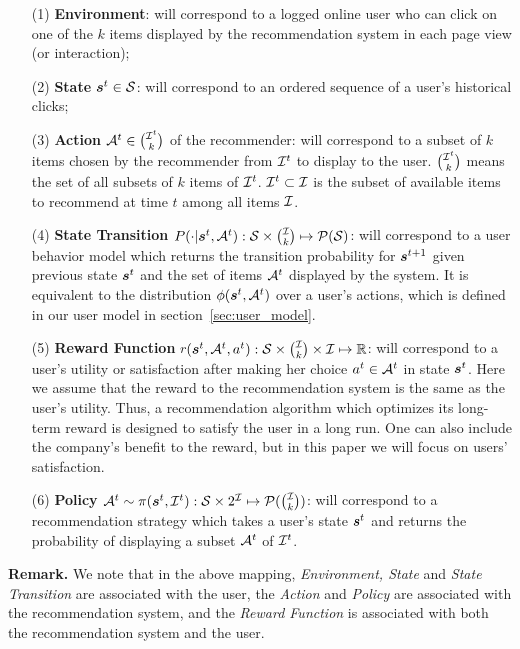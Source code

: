 \documentclass{article} %
\begin{document}
\begin{enumerate}
    \item[(1)] {\bf Environment}: will correspond to a logged online user who can click on one of the $k$ items displayed by the recommendation system in each page view (or interaction);
    \item[(2)] {\bf State ${\bm{s}}^t \in {\mathcal{S}}$}: will correspond to an ordered sequence of a user's historical clicks; %
    \item[(3)] {\bf Action {\small${\mathcal{A}}^t \in {{\mathcal{I}}^t \choose k}$}} of the recommender: will correspond to a subset of $k$ items chosen by the recommender from ${\mathcal{I}}^t$ to display to the user. {\small${{\mathcal{I}}^t \choose k}$} means the set of all subsets of $k$ items of ${\mathcal{I}}^t$. ${\mathcal{I}}^t \subset{{\mathcal{I}}}$ is the subset of available items to recommend at time $t$ among all items ${\mathcal{I}}$. 
    \item[(4)] {\bf State Transition {\small$P(\cdot|{\bm{s}}^t,{\mathcal{A}}^t):{\mathcal{S}} \times {{\mathcal{I}}\choose k} \mapsto {\mathcal{P}}({\mathcal{S}})$}}: will correspond to a user behavior model which returns the transition probability for ${\bm{s}}^{t+1}$ given previous state ${\bm{s}}^t$ and the set of items ${\mathcal{A}}^t$ displayed by the system. It is equivalent to the distribution $\phi({\bm{s}}^t, {\mathcal{A}}^t)$ over a user's actions, which is defined in our user model in section~\ref{sec:user_model}.
    \item[(5)] {\bf Reward Function} $r${\small$({\bm{s}}^t,{\mathcal{A}}^t, a^t):{\mathcal{S}}  \times {{\mathcal{I}}\choose k} \times {\mathcal{I}} \mapsto {\mathbb{R}}$}: will correspond to a user's utility or satisfaction after making her choice {\small$a^t\in {\mathcal{A}}^t$} in state ${\bm{s}}^t$. Here we assume that the reward to the recommendation system is the same as the user's utility. Thus, a recommendation algorithm which optimizes its long-term reward is designed to satisfy the user in a long run. %
    One can also include the company's benefit to the reward, but in this paper we will focus on users'  satisfaction. 
    \item[(6)] {\bf Policy {\small${\mathcal{A}}^t \sim \pi({\bm{s}}^t, {\mathcal{I}}^t):{\mathcal{S}}\times 2^{{\mathcal{I}}} \mapsto {\mathcal{P}}({{\mathcal{I}} \choose k})$}}: will correspond to a recommendation strategy which takes a user's state ${\bm{s}}^t$ and returns the probability of displaying a subset {\small${\mathcal{A}}^t$} of {\small${\mathcal{I}}^t$}. 
\end{enumerate}
{\bf Remark.} We note that in the above mapping, {\it Environment, State} and {\it State Transition} are associated with the user, the {\it Action} and {\it Policy} are associated with the recommendation system, and the {\it Reward Function} is associated with both the recommendation system and the user.
\end{document}
